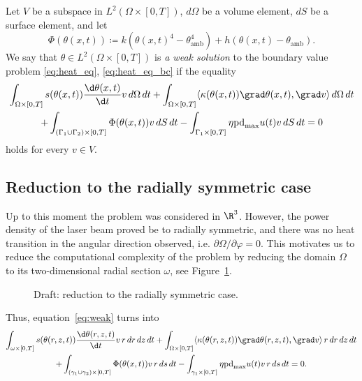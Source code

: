 \begin{definition}
	Let $V$ be a subspace in $L^2(\Omega \times [0,T])$, $d\Omega$ be a volume element, $dS$ be a surface element, and let
	\begin{equation*}
		\Phi(\theta(x,t)) \coloneqq k (\theta(x,t)^4 - \theta_\text{amb}^4) + h (\theta(x,t) - \theta_\text{amb}).
	\end{equation*}
	We say that $\theta \in L^2(\Omega \times [0,T])$ is \emph{a weak solution} to the boundary value problem \eqref{eq:heat_eq}, \eqref{eq:heat_eq_bc} if the equality
	\begin{multline} \label{eq:weak}
		\int_{\Omega \times [0,T]} s(\theta(x,t)) \frac{\d \theta(x,t)}{\d t} v\, d\Omega\, dt
		+
		\int_{\Omega \times [0,T]} \langle \kappa(\theta(x,t)) \grad\theta(x,t), \grad v \rangle \, d\Omega\, dt \\
		+
		\int_{(\Gamma_1 \cup \Gamma_2) \times [0,T]} \Phi(\theta(x,t)) v\, dS\, dt -
		\int_{\Gamma_1 \times [0,T]} \eta \text{pd}_{\max} u(t) v\, dS\, dt = 0
	\end{multline}
	holds for every $v\in V$.
\end{definition}


\subsection{Reduction to the radially symmetric case}

Up to this moment the problem was considered in $\R^3$.
However, the power density of the laser beam proved be to radially symmetric, and there was no heat transition in the angular direction observed, i.e. $\partial\Omega/\partial\varphi = 0$. This motivates us to reduce the computational complexity of the problem by reducing the domain $\Omega$ to its two-dimensional radial section $\omega$, see Figure~\ref{fig:sec}.

\begin{figure}
	\centering
	
	
	\caption{Draft: reduction to the radially symmetric case.}
	\label{fig:sec}
\end{figure}

Thus, equation~\ref{eq:weak} turns into
\begin{multline} \label{eq:weak_reduced}
	\int_{\omega \times [0,T]} s(\theta(r,z,t)) \frac{\d \theta(r,z,t)}{\d t} v\, r\, dr\, dz\, dt
	+
	\int_{\Omega \times [0,T]} \langle \kappa(\theta(r,z,t)) \grad\theta(r,z,t), \grad v \rangle \, r\, dr\, dz\, dt \\
	+
	\int_{(\gamma_1 \cup \gamma_2) \times [0,T]} \Phi(\theta(x,t)) v\, r\, ds\, dt -
	\int_{\gamma_1 \times [0,T]} \eta \text{pd}_{\max} u(t) v\, r\, ds\, dt = 0.
\end{multline}


